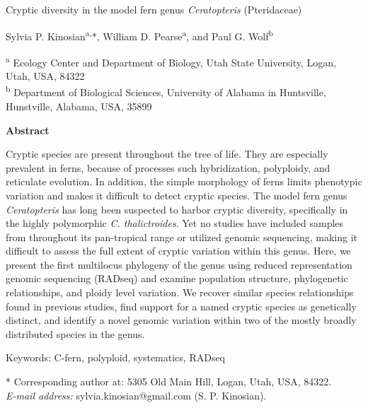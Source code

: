 \documentclass[12pt]{article}
\begin{document}
\begin{flushleft}
{\large{Cryptic diversity in the model fern genus \textit{Ceratopteris} (Pteridaceae)}}

Sylvia P. Kinosian\textsuperscript{a,}*, William D. Pearse\textsuperscript{a}, and Paul G. Wolf\textsuperscript{b}

{\small{\textsuperscript{a} Ecology Center and Department of Biology, Utah State University, Logan, Utah, USA, 84322\\
\textsuperscript{b} Department of Biological Sciences, University of Alabama in Huntsville, Hunstville, Alabama, USA, 35899}}

\textbf{Abstract}

Cryptic species are present throughout the tree of life. They are especially prevalent in ferns, because of processes such hybridization, polyploidy, and reticulate evolution. In addition, the simple morphology of ferns limits phenotypic variation and makes it difficult to detect cryptic species. The model fern genus \textit{Ceratopteris} has long been suspected to harbor cryptic diversity, specifically in the highly polymorphic \textit{C. thalictroides}. Yet no studies have included samples from throughout its pan-tropical range or utilized genomic sequencing, making it difficult to assess the full extent of cryptic variation within this genus. Here, we present the first multilocus phylogeny of the genus using reduced representation genomic sequencing (RADseq) and examine population structure, phylogenetic relationships, and ploidy level variation. We recover similar species relationships found in previous studies, find support for a named cryptic species as genetically distinct, and identify a novel genomic variation within two of the mostly broadly distributed species in the genus.

Keywords: C-fern, polyploid, systematics, RADseq

* Corresponding author at: 5305 Old Main Hill, Logan, Utah, USA, 84322. \\ \textit{E-mail address:} sylvia.kinosian@gmail.com (S. P. Kinosian).

\setlength{\parindent}{5ex}

\vspace{30cm}
\end{flushleft}
\end{document}
